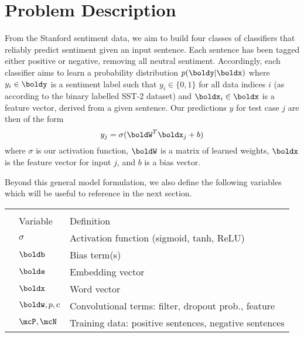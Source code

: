\documentclass[11pt]{article}
\begin{document}
\section{Problem Description}
From the Stanford sentiment data, we aim to build four classes of classifiers that reliably predict sentiment given an input sentence. Each sentence has been tagged either positive or negative, removing all neutral sentiment. Accordingly, each classifier aims to learn a probability distribution 
$p(\boldy | \boldx)$
where $y_i \in \boldy$ is a sentiment label such that $y_i \in \{0, 1\}$ for all data indices $i$ (as according to the binary labelled SST-2 dataset) and $\boldx_i \in \boldx$ is a feature vector, derived from a given sentence. Our predictions $y$ for test case $j$ are then of the form
\[
y_j = \sigma(\boldW^T \boldx_j + b)
\]
where $\sigma$ is our activation function, $\boldW$ is a matrix of learned weights, $\boldx$ is the feature vector for input $j$, and $b$ is a bias vector.

Beyond this general model formulation, we also define the following variables which will be useful to reference in the next section.

\begin{center}
    \begin{tabular}{@{}lll@{}}
        &\multicolumn{2}{c}{} \\
        & Variable & Definition\\
        \midrule
        & $\sigma$ & Activation function (sigmoid, tanh, ReLU) \\
        & $\boldb$ & Bias term(s) \\
        & $\bolde$ & Embedding vector \\
        & $\boldx$ & Word vector \\
        & $\boldw, p, c$ & Convolutional terms: filter, dropout prob., feature\\
        & $\mcP, \mcN$ & Training data: positive sentences, negative sentences \\
        \bottomrule
    \end{tabular}
\end{center}




\end{document}
